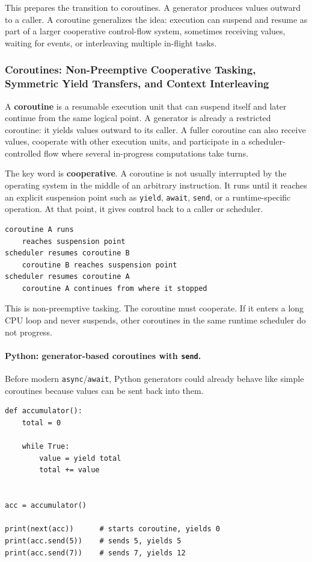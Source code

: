 This prepares the transition to coroutines. A generator produces values outward to a caller. A coroutine generalizes the idea: execution can suspend and resume as part of a larger cooperative control-flow system, sometimes receiving values, waiting for events, or interleaving multiple in-flight tasks.



\subsubsection{Coroutines: Non-Preemptive Cooperative Tasking, Symmetric Yield Transfers, and Context Interleaving}

A \textbf{coroutine} is a resumable execution unit that can suspend itself and later continue from the same logical point. A generator is already a restricted coroutine: it yields values outward to its caller. A fuller coroutine can also receive values, cooperate with other execution units, and participate in a scheduler-controlled flow where several in-progress computations take turns.

The key word is \textbf{cooperative}. A coroutine is not usually interrupted by the operating system in the middle of an arbitrary instruction. It runs until it reaches an explicit suspension point such as \texttt{yield}, \texttt{await}, \texttt{send}, or a runtime-specific operation. At that point, it gives control back to a caller or scheduler.

\begin{verbatim}
coroutine A runs
    reaches suspension point
scheduler resumes coroutine B
    coroutine B reaches suspension point
scheduler resumes coroutine A
    coroutine A continues from where it stopped
\end{verbatim}

This is non-preemptive tasking. The coroutine must cooperate. If it enters a long CPU loop and never suspends, other coroutines in the same runtime scheduler do not progress.

\paragraph{Python: generator-based coroutines with \texttt{send}.}

Before modern \texttt{async}/\texttt{await}, Python generators could already behave like simple coroutines because values can be sent back into them.

\begin{verbatim}
def accumulator():
    total = 0

    while True:
        value = yield total
        total += value


acc = accumulator()

print(next(acc))      # starts coroutine, yields 0
print(acc.send(5))    # sends 5, yields 5
print(acc.send(7))    # sends 7, yields 12
\end{verbatim}

